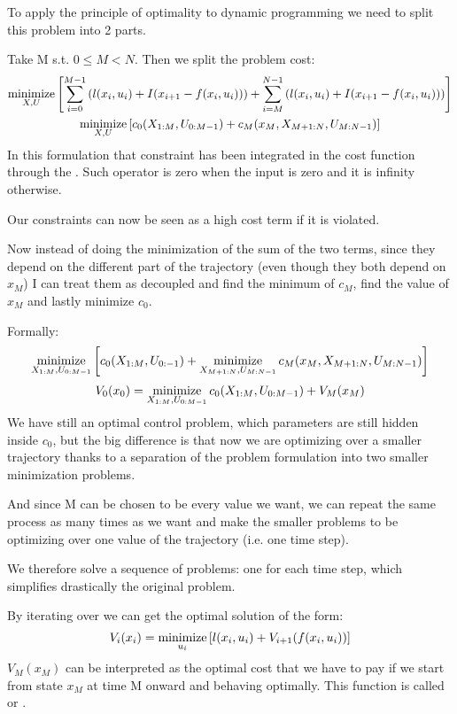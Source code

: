 To apply the principle of optimality to dynamic programming we need to split this problem into 2 parts.

Take M s.t. $0 \le M < N$. Then we split the problem cost:
\begin{gather}
\operatorname*{minimize}_{X, U} \left[\sum_{i=0}^{M-1} \left( l(x_i, u_i) + I(x_{i+1} - f(x_i, u_i))\right) + \sum_{i=M}^{N-1}\left( l(x_i, u_i) + I(x_{i+1} - f(x_i, u_i))\right)\right]\\
\operatorname*{minimize}_{X, U} \left[c_0(X_{1:M}, U_{0:M-1}) + c_M(x_M, X_{M+1:N}, U_{M:N-1})\right]
\end{gather}
In this formulation that constraint has been integrated in the cost function through the . Such operator is zero when the input is zero and it is infinity otherwise.

Our constraints can now be seen as a high cost term if it is violated.

Now instead of doing the minimization of the sum of the two terms, since they depend on the different part of the trajectory (even though they both depend on $x_M$) I can treat them as decoupled and find the minimum of $c_M$, find the value of $x_M$ and lastly minimize $c_0$.

Formally:
\[\operatorname*{minimize}_{X_{1:M}, U_{0:M-1}}\left[c_0(X_{1:M},U_{0:-1}) + \operatorname*{minimize}_{X_{M+1:N}, U_{M:N-1}} c_M(x_M, X_{M+1:N}, U_{M:N-1})\right]\]
\[V_0(x_0) = \operatorname*{minimize}_{X_{1:M}, U_{0:M-1}} c_0(X_{1:M}, U_{0:M-1}) + V_M(x_M)\]
We have still an optimal control problem, which parameters are still hidden inside $c_0$, but the big difference is that now we are optimizing over a smaller trajectory thanks to a separation of the problem formulation into two smaller minimization problems.

And since M can be chosen to be every value we want, we can repeat the same process as many times as we want and make the smaller problems to be optimizing over one value of the trajectory (i.e. one time step).

We therefore solve a sequence of problems: one for each time step, which simplifies drastically the original problem.

By iterating over we can get the optimal solution of the form:
\[V_i(x_i) = \operatorname*{minimize}_{u_i}\left[l(x_i,u_i) + V_{i+1}(f(x_i,u_i))\right]\]
$V_M(x_M)$ can be interpreted as the optimal cost that we have to pay if we start from state $x_M$ at time M onward and behaving optimally. This function is called  or .

